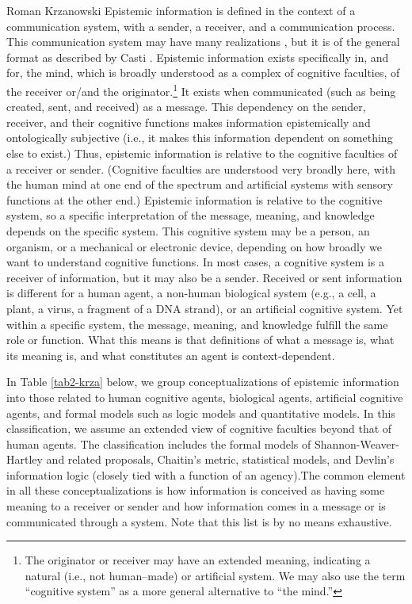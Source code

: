 \begin{artengenv}{Roman Krzanowski}
Epistemic information is defined in the context of a communication system, with a sender, a receiver, and a communication process. This communication system may have many realizations
\parencites[e.g.][]{cherry_human_1978}[][]{shannon_mathematical_1948}[][]{maynard_smith_concept_2000}[][]{vernon_artificial_2014}, %
 but it is of the general format as described by Casti 
\parencite*[][]{casti_paradigms_1990}. %
 Epistemic information exists specifically in, and for, the mind, which is broadly understood as a complex of cognitive faculties, of the receiver or/and the originator.\footnote{The originator or receiver may have an extended meaning, indicating a natural (i.e., not human–made) or artificial system. We may also use the term ``cognitive system'' as a more general alternative to ``the mind.''} It exists when communicated (such as being created, sent, and received) as a message. This dependency on the sender, receiver, and their cognitive functions makes information epistemically and ontologically subjective (i.e., it makes this information dependent on something else to exist.) Thus, epistemic information is relative to the cognitive faculties of a receiver or sender. (Cognitive faculties are understood very broadly here, with the human mind at one end of the spectrum and artificial systems with sensory functions at the other end.) Epistemic information is relative to the cognitive system, so a specific interpretation of the message, meaning, and knowledge depends on the specific system. This cognitive system may be a person, an organism, or a mechanical or electronic device, depending on how broadly we want to understand cognitive functions. In most cases, a cognitive system is a receiver of information, but it may also be a sender. Received or sent information is different for a human agent, a non-human biological system (e.g., a cell, a plant, a virus, a fragment of a DNA strand), or an artificial cognitive system. Yet within a specific system, the message, meaning, and knowledge fulfill the same role or function. What this means is that definitions of what a message is, what its meaning is, and what constitutes an agent is context-dependent.

In Table \ref{tab2-krza} below, we group conceptualizations of epistemic information into those related to human cognitive agents, biological agents, artificial cognitive agents, and formal models such as logic models and quantitative models. In this classification, we assume an extended view of cognitive faculties beyond that of human agents. The classification includes the formal models of Shannon-Weaver-Hartley and related proposals, Chaitin's metric, statistical models, and Devlin's information logic (closely tied with a function of an agency).The common element in all these conceptualizations is how information is conceived as having some meaning to a receiver or sender and how information comes in a message or is communicated through a system. Note that this list is by no means exhaustive.


\end{artengenv}
